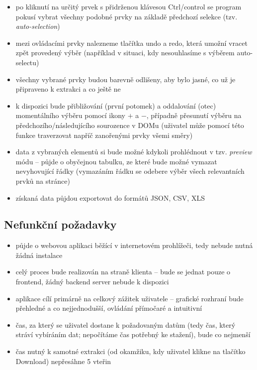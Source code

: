 \documentclass[thesis=B,czech]{FITthesis}[2012/06/26]
\begin{document}
\begin{itemize}
	\item po kliknutí na určitý prvek s přidrženou klávesou \textsf{Ctrl/control} se program pokusí vybrat všechny podobné prvky na základě předchozí selekce (tzv. \emph{auto-selection})
	\item mezi ovládacími prvky nalezneme tlačítka \textsf{undo} a \textsf{redo}, která umožní vracet zpět provedený výběr (například v situaci, kdy nesouhlasíme s výběrem auto-selectu)
	\item všechny vybrané prvky budou barevně odlišeny, aby bylo jasné, co už je připraveno k extrakci a co ještě ne
	\item k dispozici bude přibližování (první potomek) a oddalování (otec) momentálního výběru pomocí ikony $+$ a $-$, případně přesunutí výběru na předchozího/následujícího sourozence v DOMu (uživatel může pomocí této funkce traverzovat napříč zanořenými prvky všemi směry)
	\item data z vybraných elementů si bude možné kdykoli prohlédnout v tzv. \textit{preview} módu -- půjde o obyčejnou tabulku, ze které bude možné vymazat nevyhovující řádky (vymazáním řádku se odebere výběr všech relevantních prvků na stránce)
	\item získaná data půjdou exportovat do formátů JSON, CSV, XLS
\end{itemize}

\subsection{Nefunkční požadavky}
\begin{itemize}
	\item půjde o webovou aplikaci běžící v internetovém prohlížeči, tedy nebude nutná žádná instalace
	\item celý proces bude realizován na straně klienta -- bude se jednat pouze o frontend, žádný backend server nebude k dispozici
	\item aplikace cílí primárně na celkový zážitek uživatele -- grafické rozhraní bude přehledné a co nejjednodušší, ovládání přímočaré a intuitivní
	\item čas, za který se uživatel dostane k požadovaným datům (tedy čas, který stráví vybíráním dat; nepočítáme čas potřebný ke stažení), bude co nejmenší
	\item čas nutný k samotné extrakci (od okamžiku, kdy uživatel klikne na tlačítko \textsf{Download}) nepřesáhne 5 vteřin
\end{itemize}
\end{document}
